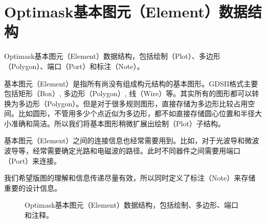 \section{Optimask基本图元（Element）数据结构} \label{SectDataElem}
Optimask基本图元（Element）数据结构，包括绘制（Plot）、多边形（Polygon）、端口（Port）和标注（Note）。

基本图元（Element）是指所有尚没有组成构元结构的基本图形。GDSII格式主要包括矩形（Box）, 多边形（Polygon）, 线（Wire）等。其实所有的图形都可以转换为多边形（Polygon）。但是对于很多规则图形，直接存储为多边形比较占用空间。比如圆形，不管用多少个点近似为多边形，都不如直接存储圆心位置和半径大小准确和简洁。所以我们将基本图形稍微扩展出绘制（Plot）子结构。

基本图元（Element）之间的连接信息也经常需要用到。比如，对于光波导和微波波导等，经常需要确定光路和电磁波的路径。此时不同器件之间需要用端口（Port）来连接。

我们希望版图的理解和信息传递尽量有效，所以同时定义了标注（Note）来存储重要的设计信息。

\begin{figure}[htb!p] %
	\centering
	\hfill
	\caption{Optimask基本图元（Element）数据结构，包括绘制、多边形、端口和注释。}
	\label{FigDataElem}
\end{figure}

